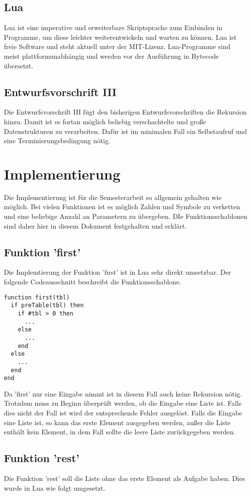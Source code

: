 \section{Lua}
Lua ist eine imperative und erweiterbare Skriptsprache zum Einbinden in Programme, um diese leichter weiterentwickeln und warten zu können. Lua ist freie Software und steht aktuell unter der MIT-Lizenz. Lua-Programme sind meist plattformunabhängig und werden vor der Ausführung in Bytecode übersetzt. 


\section{Entwurfsvorschrift III}
Die Entwurfsvorschrift III fügt den bisherigen Entwurfsvorschriften die Rekursion hinzu. Damit ist es fortan möglich beliebig verschachtelte und große Datenstrukturen zu verarbeiten. Dafür ist im minimalen Fall ein Selbstaufruf und eine Terminierungsbedingung nötig.

\chapter{Implementierung}
Die Implementierung ist für die Semesterarbeit so allgemein gehalten wie möglich. Bei vielen Funktionen ist es möglich Zahlen und Symbole zu verketten und eine beliebige Anzahl an Parametern zu übergeben. DIe Funktionsschablonen sind daher hier in diesem Dokument festgehalten und erklärt.

\section{Funktion 'first'}
Die Implemtierung der Funktion 'first' ist in Lua sehr direkt umsetzbar. Der folgende Codeausschnitt beschreibt die Funktionsschablone.
\begin{lstlisting}
function first(tbl)
  if preTable(tbl) then
    if #tbl > 0 then
      ...
    else
      ...
    end
  else
    ...
  end
end
\end{lstlisting}

Da 'first' nur eine Eingabe nimmt ist in diesem Fall auch keine Rekursion nötig. Trotzdem muss zu Beginn überprüft werden, ob die Eingabe eine Liste ist. Falls dies nicht der Fall ist wird der entsprechende Fehler ausgelöst. Falls die Eingabe eine Liste ist, so kann das erste Element ausgegeben werden, außer die Liste enthält kein Element, in dem Fall sollte die leere Liste zurückgegeben werden.

\section{Funktion 'rest'}
Die Funktion 'rest' soll die Liste ohne das erste Element als Aufgabe haben. Dies wurde in Lua wie folgt umgesetzt.

